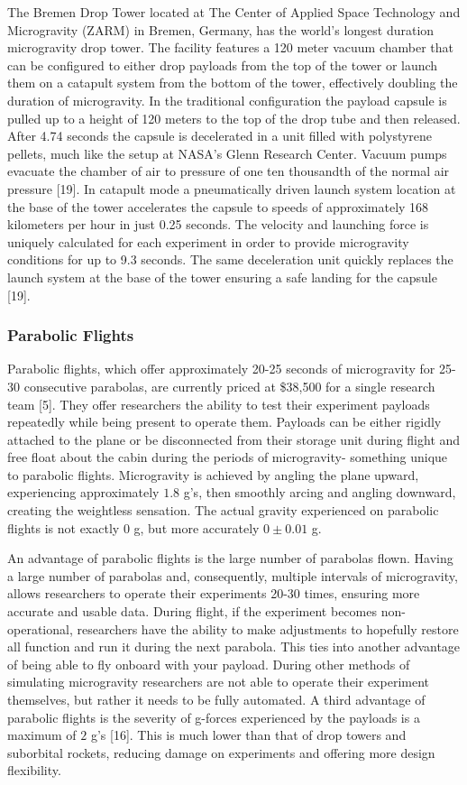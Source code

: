 \indent The Bremen Drop Tower located at The Center of Applied Space Technology and Microgravity (ZARM) in Bremen, Germany, has the world’s longest duration microgravity drop tower. The facility features a 120 meter vacuum chamber that can be configured to either drop payloads from the top of the tower or launch them on a catapult system from the bottom of the tower, effectively doubling the duration of microgravity. In the traditional configuration the payload capsule is pulled up to a height of 120 meters to the top of the drop tube and then released. After 4.74 seconds the capsule is decelerated in a unit filled with polystyrene pellets, much like the setup at NASA’s Glenn Research Center. Vacuum pumps evacuate the chamber of air to pressure of one ten thousandth of the normal air pressure [19]. In catapult mode a pneumatically driven launch system location at the base of the tower accelerates the capsule to speeds of approximately 168 kilometers per hour in just 0.25 seconds. The velocity and launching force is uniquely calculated for each experiment in order to provide microgravity conditions for up to 9.3 seconds. The same deceleration unit quickly replaces the launch system at the base of the tower ensuring a safe landing for the capsule [19].

\subsubsection{Parabolic Flights}

\indent\indent Parabolic flights, which offer approximately 20-25 seconds of microgravity for 25-30 consecutive parabolas, are currently priced at \$38,500 for a single research team [5]. They offer researchers the ability to test their experiment payloads repeatedly while being present to operate them. Payloads can be either rigidly attached to the plane or be disconnected from their storage unit during flight and free float about the cabin during the periods of microgravity- something unique to parabolic flights. Microgravity is achieved by angling the plane upward, experiencing approximately $1.8$ g’s, then smoothly arcing and angling downward, creating the weightless sensation. The actual gravity experienced on parabolic flights is not exactly $0$ g, but more accurately $0 ± 0.01$ g.

\indent An advantage of parabolic flights is the large number of parabolas flown. Having a large number of parabolas and, consequently, multiple intervals of microgravity, allows researchers to operate their experiments 20-30 times, ensuring more accurate and usable data. During flight, if the experiment becomes non-operational, researchers have the ability to make adjustments to hopefully restore all function and run it during the next parabola. This ties into another advantage of being able to fly onboard with your payload. During other methods of simulating microgravity researchers are not able to operate their experiment themselves, but rather it needs to be fully automated. A third advantage of parabolic flights is the severity of g-forces experienced by the payloads is a maximum of $2$ g’s [16]. This is much lower than that of drop towers and suborbital rockets, reducing damage on experiments and offering more design flexibility.

